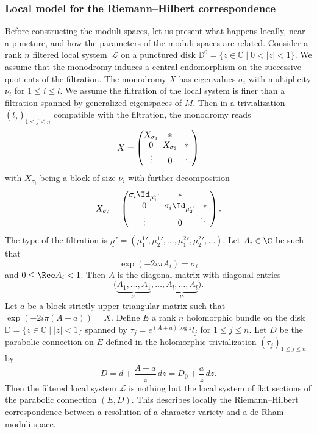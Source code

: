 \subsubsection{Local model for the Riemann--Hilbert correspondence}\label{subsub_local_RH}
Before constructing the moduli spaces, let us present what happens locally, near a puncture, and how the parameters of the moduli spaces are related. Consider a rank $n$ filtered local system~$\mathcal{L}$ on a punctured disk $\mathbb{D}^0=\lbrace z\in \mathbb{C} \mid 0 < |z|< 1\rbrace$. We assume that the monodromy induces a central endomorphism on the successive quotients of the filtration. The monodromy $X$ has eigenvalues $\sigma_i$ with multiplicity $\nu_i$ for $1\le i \le l$. We assume the filtration of the local system is finer than a filtration spanned by generalized eigenspaces of $M$. Then in a trivialization $(l_j)_{1\le j \le n}$ compatible with the filtration, the monodromy reads
\[\arraycolsep2.5pt
X =
\begin{pmatrix}
X_{\sigma_1} & *& \\
0 & X_{\sigma_2} & *\\
\vdots & 0 & \ddots
\end{pmatrix}
\]
with $X_{\sigma_i}$ being a block of size $\nu_i$ with further decomposition
\[\arraycolsep2.5pt
X_{\sigma_i} =
\begin{pmatrix}
\sigma_i \Id_{{\mu^i_1}'} & *& \\
0 & \sigma_i \Id_{{\mu^i_2}'} & *\\
\vdots & 0 & \ddots
\end{pmatrix}.
\]
The type of the filtration is $\underline{\mu}'=({\mu^1_1}',{\mu^1_2}',\dots,{\mu^2_1}',{\mu^2_2}',\dots)$. Let $A_i \in \C$ be such that
\[
\exp(- 2 i \pi A_i)=\sigma_i
\]
and $0 \le \Ree A_i<1$. Then $A$ is the diagonal matrix with diagonal entries
\[
\bigl(\underbrace{A_1,\dots,A_1}_{\nu_1},\dots,\underbrace{A_l,\dots,A_l}_{\nu_l}\bigr).
\]
Let $a$ be a block strictly upper triangular matrix such that $\exp\left(-2i\pi (A+a)\right)=X$. Define $E$ a rank $n$ holomorphic bundle on the disk $\mathbb{D}=\lbrace z\in\mathbb{C} \mid |z|<1\rbrace$ spanned by $\tau_j=e^{(A+a) \log z} l_j$ for $1\le j\le n$. Let $D$ be the parabolic connection on $E$ defined in the holomorphic trivialization $(\tau_j)_{1\le j\le n}$ by
\[
D = d + \frac{A+a}{z}\, dz = D_0 + \frac{a}{z}\, dz.
\]
Then the filtered local system $\mathcal{L}$ is nothing but the local system of flat sections of the parabolic connection $(E,D)$. This describes locally the Riemann--Hilbert correspondence between a resolution of a character variety and a de Rham moduli space.

